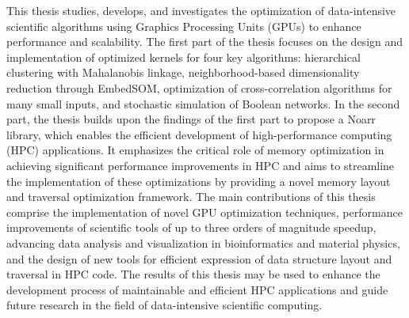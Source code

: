 \documentclass[12pt]{report}
\begin{document}
This thesis studies, develops, and investigates the optimization of data-intensive scientific algorithms using Graphics Processing Units (GPUs) to enhance performance and scalability. The first part of the thesis focuses on the design and implementation of optimized kernels for four key algorithms: hierarchical clustering with Mahalanobis linkage, neighborhood-based dimensionality reduction through EmbedSOM, optimization of cross-correlation algorithms for many small inputs, and stochastic simulation of Boolean networks. In the second part, the thesis builds upon the findings of the first part to propose a Noarr library, which enables the efficient development of high-performance computing (HPC) applications. It emphasizes the critical role of memory optimization in achieving significant performance improvements in HPC and aims to streamline the implementation of these optimizations by providing a novel memory layout and traversal optimization framework. The main contributions of this thesis comprise the implementation of novel GPU optimization techniques, performance improvements of scientific tools of up to three orders of magnitude speedup, advancing data analysis and visualization in bioinformatics and material physics, and the design of new tools for efficient expression of data structure layout and traversal in HPC code. The results of this thesis may be used to enhance the development process of maintainable and efficient HPC applications and guide future research in the field of data-intensive scientific computing.
\end{document}
